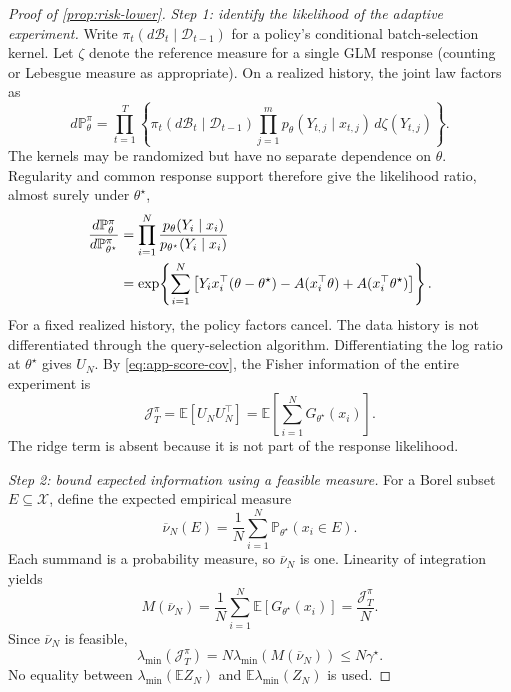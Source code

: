 \documentclass[10pt,twoside,letterpaper]{article}
\newcommand{\E}{\mathbb E}
\newcommand{\Prob}{\mathbb P}
\begin{document}
\begin{proof}[Proof of \cref{prop:risk-lower}]
\textit{Step 1: identify the likelihood of the adaptive experiment.}
Write $\pi_t(d\mathcal B_t\mid\mathcal D_{t-1})$ for a policy's
conditional batch-selection kernel. Let $\zeta$ denote the reference
measure for a single GLM response (counting or Lebesgue measure as
appropriate). On a realized history, the joint law factors as
\begin{equation}
d\Prob_\theta^\pi
=\prod_{t=1}^T\left\{
 \pi_t(d\mathcal B_t\mid\mathcal D_{t-1})
 \prod_{j=1}^mp_\theta(Y_{t,j}\mid x_{t,j})\,d\zeta(Y_{t,j})
\right\}.
\label{eq:app-adaptive-factorization}
\end{equation}
The kernels may be randomized but have no separate dependence on
$\theta$. Regularity and common response support therefore give the
likelihood ratio, almost surely under $\theta^\star$,
\begin{align}
\frac{d\Prob_\theta^\pi}{d\Prob_{\theta^\star}^\pi}
&=\prod_{i=1}^N\frac{p_\theta(Y_i\mid x_i)}
{p_{\theta^\star}(Y_i\mid x_i)}\notag\\
&=\exp\!\left\{\sum_{i=1}^N
\big[Y_ix_i^\top(\theta-\theta^\star)
-A(x_i^\top\theta)+A(x_i^\top\theta^\star)\big]\right\}.
\label{eq:app-adaptive-ratio-general}
\end{align}
For a fixed realized history, the policy factors cancel. The data
history is not differentiated through the query-selection algorithm.
Differentiating the log ratio at $\theta^\star$ gives $U_N$.
By \eqref{eq:app-score-cov}, the Fisher information of the entire
experiment is
\begin{equation}
\mathcal J_T^\pi=\E[U_NU_N^\top]
=\E\!\left[\sum_{i=1}^NG_{\theta^\star}(x_i)\right].
\label{eq:app-adaptive-fisher}
\end{equation}
The ridge term is absent because it is not part of the response
likelihood.

\textit{Step 2: bound expected information using a feasible measure.}
For a Borel subset $E\subseteq\mathcal X$, define the expected
empirical measure
\begin{equation}
\overline\nu_N(E)=\frac1N\sum_{i=1}^N\Prob_{\theta^\star}(x_i\in E).
\label{eq:app-expected-measure}
\end{equation}
Each summand is a probability measure, so $\overline\nu_N$ is one.
Linearity of integration yields
\begin{equation}
M(\overline\nu_N)
=\frac1N\sum_{i=1}^N\E[G_{\theta^\star}(x_i)]
=\frac{\mathcal J_T^\pi}{N}.
\label{eq:app-expected-feasible-information}
\end{equation}
Since $\overline\nu_N$ is feasible,
\begin{equation}
\lambda_{\min}(\mathcal J_T^\pi)
=N\lambda_{\min}(M(\overline\nu_N))\le N\gamma^\star.
\label{eq:app-expected-information-ceiling}
\end{equation}
No equality between $\lambda_{\min}(\E Z_N)$ and
$\E\lambda_{\min}(Z_N)$ is used.


\end{proof}
\end{document}
